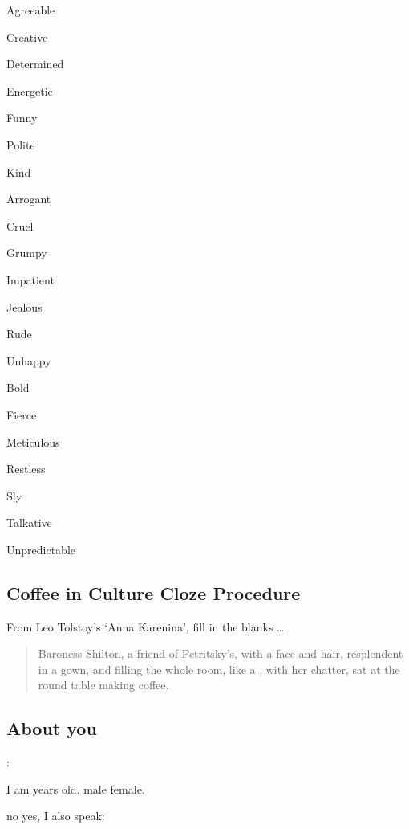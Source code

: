 \documentclass[a4paper,10pt]{article}
\begin{document}
\begin{multicols}{3}
    \begin{Qlist}
        \item Agreeable
        \item Creative
        \item Determined
        \item Energetic
        \item Funny
        \item Polite
        \item Kind
    \end{Qlist}
    \begin{Qlist}
        \item Arrogant
        \item Cruel
        \item Grumpy
        \item Impatient
        \item Jealous
        \item Rude
        \item Unhappy
    \end{Qlist}
    \begin{Qlist}
        \item Bold
        \item Fierce
        \item Meticulous
        \item Restless
        \item Sly
        \item Talkative
        \item Unpredictable
    \end{Qlist}
\end{multicols}

\subsection*{Coffee in Culture Cloze Procedure}

From Leo Tolstoy's `Anna Karenina', fill in the blanks \ldots

\begin{quote}
Baroness Shilton, a friend of Petritsky’s, with a \Qline{3cm} face and \Qline{3cm} hair, resplendent in a \Qline{3cm} gown, 
and filling the whole room, like a \Qline{3cm}, with her \Qline{3cm} chatter, sat at the round table making coffee.
\end{quote}

\subsection*{About you}

: \Qline{12cm}

 I am \Qline{2cm} years old. \hfil {} \QO{} male \QO{} female. 

 \hfil \QO{} no \hfil \QO{} yes, I also speak: \Qline{4cm}
\end{document}
